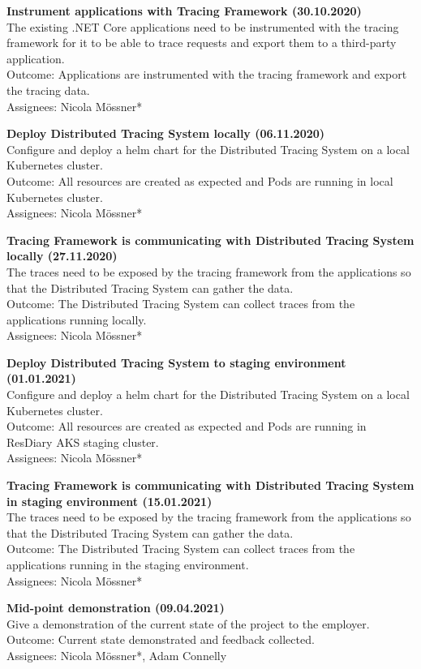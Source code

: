 \documentclass[11pt]{article}
\begin{document}
\textbf{Instrument applications with Tracing Framework (30.10.2020)}\\
The existing .NET Core applications need to be instrumented with the tracing framework for it to be able to trace requests and export them to a third-party application.\\
Outcome: Applications are instrumented with the tracing framework and export the tracing data.\\
Assignees: Nicola M\"{o}ssner*

\textbf{Deploy Distributed Tracing System locally (06.11.2020)}\\
Configure and deploy a helm chart for the Distributed Tracing System on a local Kubernetes cluster.\\
Outcome: All resources are created as expected and Pods are running in local Kubernetes cluster.\\
Assignees: Nicola M\"{o}ssner*

\textbf{Tracing Framework is communicating with Distributed Tracing System locally (27.11.2020)}\\
The traces need to be exposed by the tracing framework from the applications so that the Distributed Tracing System can gather the data.\\
Outcome: The Distributed Tracing System can collect traces from the applications running locally.\\
Assignees: Nicola M\"{o}ssner*

\textbf{Deploy Distributed Tracing System to staging environment (01.01.2021)}\\
Configure and deploy a helm chart for the Distributed Tracing System on a local Kubernetes cluster.\\
Outcome: All resources are created as expected and Pods are running in ResDiary AKS staging cluster.\\
Assignees: Nicola M\"{o}ssner*

\textbf{Tracing Framework is communicating with Distributed Tracing System in staging environment (15.01.2021)}\\
The traces need to be exposed by the tracing framework from the applications so that the Distributed Tracing System can gather the data.\\
Outcome: The Distributed Tracing System can collect traces from the applications running in the staging environment.\\
Assignees: Nicola M\"{o}ssner*

\textbf{Mid-point demonstration (09.04.2021)}\\
Give a demonstration of the current state of the project to the employer.\\
Outcome: Current state demonstrated and feedback collected.\\
Assignees: Nicola M\"{o}ssner*, Adam Connelly
\end{document}
